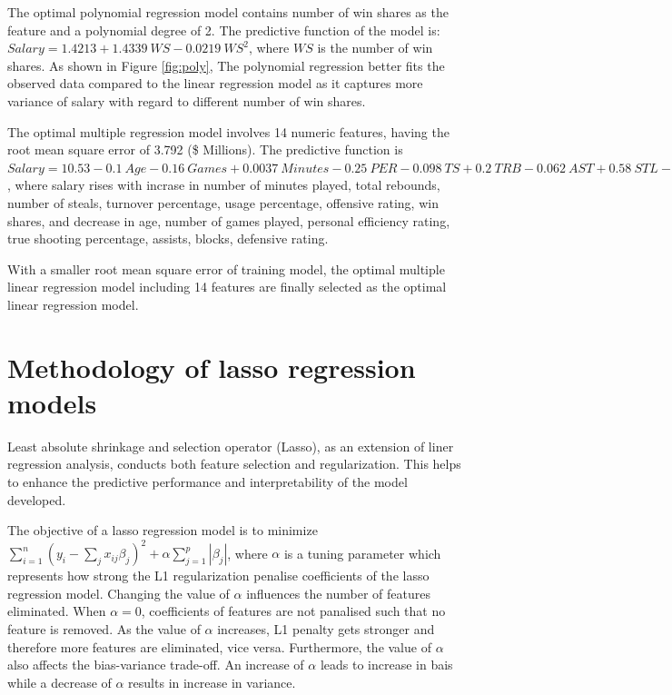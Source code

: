 \documentclass[letterpaper,12pt,twoside,]{pinp}
\begin{document}
The optimal polynomial regression model contains number of win shares as
the feature and a polynomial degree of 2. The predictive function of the
model is: \(Salary=1.4213+1.4339~WS-0.0219~WS^2\), where \(WS\) is the
number of win shares. As shown in Figure \ref{fig:poly}, The polynomial
regression better fits the observed data compared to the linear
regression model as it captures more variance of salary with regard to
different number of win shares.

The optimal multiple regression model involves 14 numeric features,
having the root mean square error of 3.792 (\$ Millions). The predictive
function is
\(Salary = 10.53-0.1~Age-0.16~Games+0.0037~Minutes-0.25~PER-0.098~TS+0.2~TRB-0.062~AST+0.58~STL-0.21~BLK+0.12~TOV+0.51~USG+0.11~ORtg-0.19～DRtg+0.49~WS\),
where salary rises with incrase in number of minutes played, total
rebounds, number of steals, turnover percentage, usage percentage,
offensive rating, win shares, and decrease in age, number of games
played, personal efficiency rating, true shooting percentage, assists,
blocks, defensive rating.

With a smaller root mean square error of training model, the optimal
multiple linear regression model including 14 features are finally
selected as the optimal linear regression model.

\hypertarget{methodology-of-lasso-regression-models}{%
\section{Methodology of lasso regression
models}\label{methodology-of-lasso-regression-models}}

Least absolute shrinkage and selection operator (Lasso), as an extension
of liner regression analysis, conducts both feature selection and
regularization. This helps to enhance the predictive performance and
interpretability of the model developed.

The objective of a lasso regression model is to minimize
\(\sum^n_{i=1}(y_i-\sum_jx_{ij}\beta_j)^2+\alpha\sum^p_{j=1}|\beta_j|\),
where \(\alpha\) is a tuning parameter which represents how strong the
L1 regularization penalise coefficients of the lasso regression model.
Changing the value of \(\alpha\) influences the number of features
eliminated. When \(\alpha=0\), coefficients of features are not
panalised such that no feature is removed. As the value of \(\alpha\)
increases, L1 penalty gets stronger and therefore more features are
eliminated, vice versa. Furthermore, the value of \(\alpha\) also
affects the bias-variance trade-off. An increase of \(\alpha\) leads to
increase in bais while a decrease of \(\alpha\) results in increase in
variance.
\end{document}
